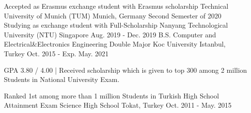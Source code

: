 \vspace{-5mm}
\begin{cventries}

\cventry
    {Accepted as Erasmus exchange student with Erasmus scholarship }
    {Technical University of Munich (TUM)} %
    {Munich, Germany} %
    {Second Semester of 2020} %
    {} 
  \vspace{-4mm}
 \cventry
    {Studying as exchange student with Full-Scholarship}
    {Nanyang Technological University (NTU)} %
    {Singapore} %
    {Aug. 2019 - Dec. 2019} %
    {} 
\vspace{-4mm}
  \cventry
    {B.S. Computer and Electrical\&Electronics Engineering Double Major} %
    {Koc University } %
    {Istanbul, Turkey} %
    {Oct. 2015 - Exp. May. 2021} %
    {
      \begin{cvitems} %
        \item {GPA 3.80 / 4.00 | Received scholarship which is given to top 300 among 2 million Students in National University Exam.}
      \end{cvitems}
    } 
\vspace{-0mm}    
  \cventry
    {Ranked 1st among more than 1 million Students in Turkish High School Attainment Exam}
    {Science High School} %
    {Tokat, Turkey} %
    {Oct. 2011 - May. 2015} %
    {}
\end{cventries}
